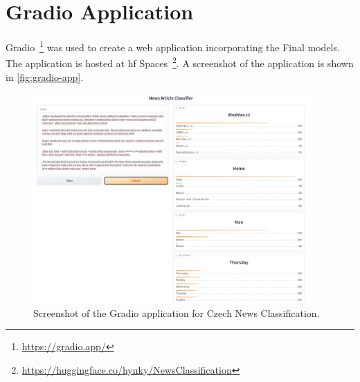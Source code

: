 \chapter{Gradio Application}
\label{chap:gradio-app}
Gradio~\footnote{\url{https://gradio.app/}}
was used to create a web application incorporating the Final models.
The application is hosted at \ac{hf} Spaces~\footnote{\url{https://huggingface.co/hynky/NewsClassification}}.
A screenshot of the application is shown in \autoref{fig:gradio-app}.

\begin{figure}[ht]
    \centering
    \includegraphics[width=0.95\textwidth]{img/gradio/gradio.png}
    \caption{Screenshot of the Gradio application for Czech News Classification.}
    \label{fig:gradio-app}
\end{figure}
